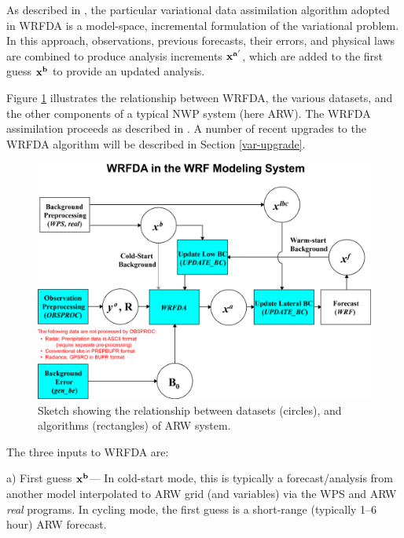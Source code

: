 As described in \citet{barker04}, the particular variational data
assimilation algorithm adopted in WRFDA is a model-space, incremental
formulation of the variational problem.  In this approach, observations,
previous forecasts, their errors, and physical laws are combined to
produce analysis increments ${\bf x^{a'}}$, which are added to the first
guess ${\bf x^{b}}$ to provide an updated analysis.

Figure \ref{var-sketch} illustrates the relationship between WRFDA,
the various datasets, and the other components of a typical NWP system
(here ARW). The WRFDA assimilation proceeds as described in
\citet{barker04}. A number of recent upgrades to the WRFDA algorithm
will be described in Section \ref{var-upgrade}.

%
%
\begin{figure}
  \centering
  \includegraphics[width=6.5in]{figures/var-sketch.pdf}
  \caption{\label{var-sketch}Sketch showing the relationship between datasets (circles), 
           and algorithms (rectangles) of ARW system.}
\end{figure}

The three inputs to WRFDA are: 

\vspace{0.5cm}

a) First guess ${\bf x^{b}}$--- In cold-start mode, this is typically a
forecast/analysis from another model interpolated to ARW grid (and variables) via the 
WPS and ARW {\it real} programs. In cycling mode, the first guess 
is a short-range (typically 1--6 hour) ARW forecast. 

\vspace{0.5cm}

